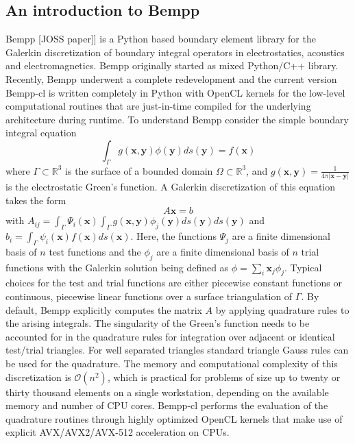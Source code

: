 \subsection{An introduction to Bempp}
Bempp [JOSS paper]] is a Python based boundary element library for the Galerkin discretization of boundary integral operators in electrostatics, acoustics and electromagnetics.
Bempp originally started as mixed Python/C++ library.
Recently, Bempp underwent a complete redevelopment and the current version Bempp-cl is written completely in Python with OpenCL kernels for the low-level computational routines that are just-in-time compiled for the underlying architecture during runtime.
To understand Bempp consider the simple boundary integral equation
$$
\int_{\Gamma} g(\mathbf{x}, \mathbf{y}) \phi(\mathbf{y})ds(\mathbf{y}) = f(\mathbf{x})
$$
where $\Gamma\subset\mathbb{R}^3$ is the surface of a bounded domain $\Omega\subset\mathbb{R}^3$, and $g(\mathbf{x}, \mathbf{y}) = \frac{1}{4\pi|\mathbf{x}-\mathbf{y}|}$ is the electrostatic Green's function.
A Galerkin discretization of this equation takes the form
$$
A\mathbf{x} = b
$$
with $A_{ij} = \int_{\Gamma}\Psi_i(\mathbf{x})\int_{\Gamma}g(\mathbf{x}, \mathbf{y})\phi_j(\mathbf{y})ds(\mathbf{y})ds(\mathbf{y})$ and $b_i = \int_{\Gamma}\psi_i(\mathbf{x})f(\mathbf{x})ds(\mathbf{x})$.
Here, the functions $\Psi_j$ are a finite dimensional basis of $n$ test functions and the $\phi_j$ are a finite dimensional basis of $n$ trial functions with the Galerkin solution being defined as $\phi=\sum_{i}\mathbf{x}_j\phi_j$.
Typical choices for the test and trial functions are either piecewise constant functions or continuous, piecewise linear functions over a surface triangulation of $\Gamma$. 
By default, Bempp explicitly computes the matrix $A$ by applying quadrature rules to the arising integrals.
The singularity of the Green's function needs to be accounted for in the quadrature rules for integration over adjacent or identical test/trial triangles.
For well separated triangles standard triangle Gauss rules can be used for the quadrature.
The memory and computational complexity of this discretization is $\mathcal{O}(n^2)$, which is practical for problems of size up to twenty or thirty thousand elements on a single workstation, depending on the available memory and number of CPU cores.
Bempp-cl performs the evaluation of the quadrature routines through highly optimized OpenCL kernels that make use of explicit AVX/AVX2/AVX-512 acceleration on CPUs.

